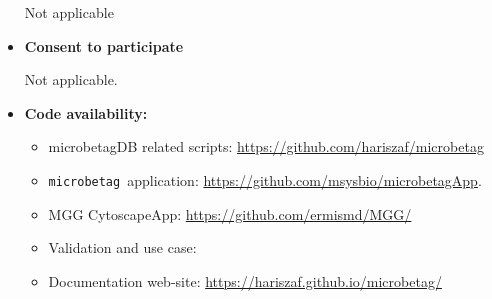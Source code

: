 \documentclass[sn-mathphys,Numbered]{sn-jnl}  %
\theoremstyle{thmstyleone}%
\theoremstyle{thmstyletwo}%
\theoremstyle{thmstylethree}%
\newcommand{\microbetag}{\texttt{microbetag}}
\begin{document}
\begin{itemize}
            Not applicable

        \item \textbf{Consent to participate}
        
            Not applicable.

        \item \textbf{Code availability: }

            \begin{itemize}
                \item microbetagDB related scripts: \href{https://github.com/hariszaf/microbetag}{https://github.com/hariszaf/microbetag}
                \item \microbetag~application: \href{https://github.com/msysbio/microbetagApp}{https://github.com/msysbio/microbetagApp}.
                \item MGG CytoscapeApp: \href{https://github.com/ermismd/MGG/}{https://github.com/ermismd/MGG/}
                \item Validation and use case: 
                \item Documentation web-site: \href{https://hariszaf.github.io/microbetag/}{https://hariszaf.github.io/microbetag/}
            \end{itemize}

    \end{itemize}
\end{document}
